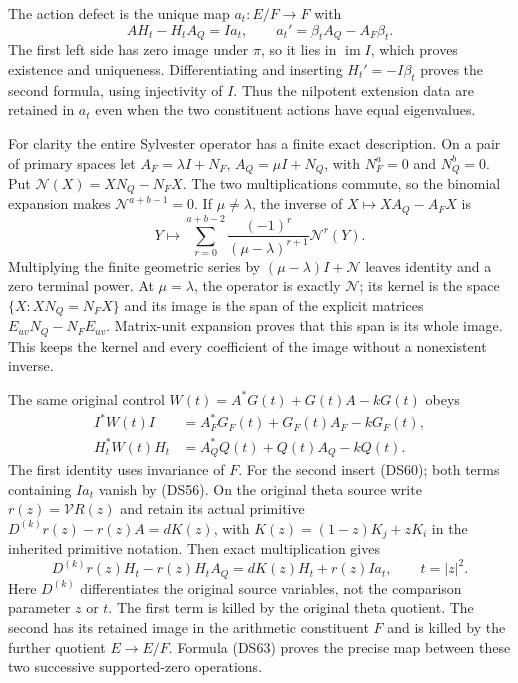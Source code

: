 \documentclass{article}
\begin{document}
The action defect is the unique map $a_t:E/F\to F$ with
\[
 AH_t-H_tA_Q=Ia_t,\qquad
 a_t'=\beta_tA_Q-A_F\beta_t.
 \tag{DS60}
\]
The first left side has zero image under $\pi$, so it lies in
$\operatorname{im}I$, which proves existence and uniqueness.
Differentiating and inserting $H_t'=-I\beta_t$ proves the second
formula, using injectivity of $I$.  Thus the nilpotent extension
data are retained in $a_t$ even when the two constituent actions
have equal eigenvalues.

For clarity the entire Sylvester operator has a finite exact
description.  On a pair of primary spaces let
$A_F=\lambda I+N_F$, $A_Q=\mu I+N_Q$, with
$N_F^a=0$ and $N_Q^b=0$.  Put
$\mathcal N(X)=XN_Q-N_FX$.  The two multiplications commute, so
the binomial expansion makes $\mathcal N^{a+b-1}=0$.  If
$\mu\ne\lambda$, the inverse of
$X\mapsto XA_Q-A_FX$ is
\[
 Y\longmapsto
 \sum_{r=0}^{a+b-2}
 \frac{(-1)^r}{(\mu-\lambda)^{r+1}}\mathcal N^r(Y).
 \tag{DS61}
\]
Multiplying the finite geometric series by
$(\mu-\lambda)I+\mathcal N$ leaves identity and a zero terminal
power.  At $\mu=\lambda$, the operator is exactly $\mathcal N$;
its kernel is the space $\{X:XN_Q=N_FX\}$ and its image is the
span of the explicit matrices
$E_{uv}N_Q-N_FE_{uv}$.  Matrix-unit expansion proves that this
span is its whole image.  This keeps the kernel and every
coefficient of the image without a nonexistent inverse.

The same original control $W(t)=A^*G(t)+G(t)A-kG(t)$ obeys
\[
\begin{split}
 I^*W(t)I&=A_F^*G_F(t)+G_F(t)A_F-kG_F(t),\\
 H_t^*W(t)H_t&=A_Q^*Q(t)+Q(t)A_Q-kQ(t).
\end{split}\tag{DS62}
\]
The first identity uses invariance of $F$.  For the second insert
(DS60); both terms containing $Ia_t$ vanish by (DS56).
On the original theta source write $r(z)=\mathcal VR(z)$ and
retain its actual primitive
$D^{(k)}r(z)-r(z)A=dK(z)$, with
$K(z)=(1-z)K_j+zK_i$ in the inherited primitive notation.
Then exact multiplication gives
\[
 D^{(k)}r(z)H_t-r(z)H_tA_Q
 =dK(z)H_t+r(z)Ia_t,\qquad t=|z|^2.
 \tag{DS63}
\]
Here $D^{(k)}$ differentiates the original source variables, not the
comparison parameter $z$ or $t$.  The first term is killed by the
original theta quotient.  The second has its retained image in the
arithmetic constituent $F$ and is killed by the further quotient
$E\to E/F$.  Formula (DS63) proves the precise map between these
two successive supported-zero operations.
\end{document}
